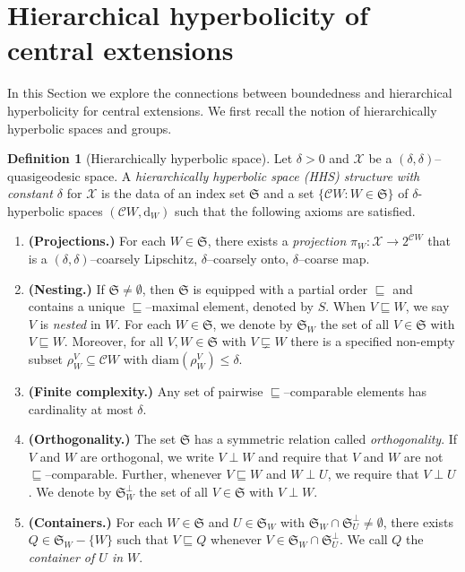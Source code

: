 \documentclass[svgnames]{amsart}
\theoremstyle{plain}
\theoremstyle{definition}
\newtheorem{defn}[thm]{Definition}
\newcommand{\cal}[1]{\mathcal{#1}}
\newcommand{\frakS}{\mathfrak{S}}
\newcommand{\C}{\cal C}
\newcommand{\diam}{\mathrm{diam}}
\newcommand{\dist}{\mathrm{d}}
\newcommand{\nest}{\sqsubseteq}
\newcommand{\propnest}{\sqsubsetneq}
\begin{document}
\section{Hierarchical hyperbolicity of central extensions}\label{sec:HHG}
In this Section we explore the connections between boundedness and hierarchical hyperbolicity for central extensions. We first recall the notion of hierarchically hyperbolic spaces and groups.
\begin{defn}[Hierarchically hyperbolic space]\label{defn:HHS}
Let $\delta>0$ and $\cal{X}$ be a $(\delta,\delta)$--quasigeodesic space.  A \emph{hierarchically hyperbolic space (HHS) structure with constant $\delta$} for $\cal{X}$ is the data of an index set $\frakS$ and a set $\{ \C W \colon W\in\frakS\}$ of $\delta$-hyperbolic spaces $(\C W,\dist_W)$ such that the following axioms are satisfied.  \begin{enumerate}[label=(\arabic*{})]
    \item\textbf{(Projections.)}\label{axiom:projections} For each $W \in \frakS$, there exists a \emph{projection} $\pi_W \colon \cal{X} \rightarrow 2^{\C W}$  that is a $(\delta,\delta)$--coarsely Lipschitz, $\delta$--coarsely onto, $\delta$--coarse map.
		
    \item \textbf{(Nesting.)} \label{axiom:nesting} If $\frakS \neq \emptyset$, then $\frakS$ is equipped with a  partial order $\nest$ and contains a unique $\nest$--maximal element, denoted by $S$. When $V\nest W$, we say $V$ is \emph{nested} in $W$.  For each $W\in\frakS$, we denote by $\frakS_W$ the set of all $V\in\frakS$ with $V\nest W$.  Moreover, for all $V,W\in\frakS$ with $V\propnest W$ there is a specified non-empty subset $\rho^V_W\subseteq \C W$ with $\diam(\rho^V_W)\leq \delta$.
        
    \item \textbf{(Finite complexity.)} \label{axiom:finite_complexity} Any set of pairwise $\nest$--comparable elements has cardinality at most $\delta$.
            
    \item \textbf{(Orthogonality.)} \label{axiom:orthogonal} The set $\frakS$ has a symmetric relation called \emph{orthogonality}. If $V$ and $W$ are orthogonal, we write $V\perp W$ and require that $V$ and $W$ are not $\nest$--comparable. Further, whenever $V\nest W$ and $W\perp U$, we require that $V\perp U$. We denote by $\frakS_W^\perp$ the set of all $V\in \frakS$ with $V\perp W$.

    \item \textbf{(Containers.)} \label{axiom:containers}  For each $W \in \frakS$ and $U \in \frakS_W$ with $ \frakS_W\cap \frakS_U^\perp \neq \emptyset$, there exists $Q \in\frakS_W-\{W\}$ such that $V \nest Q$ whenever $V \in\frakS_W \cap \frakS_U^\perp$.  We call $Q$ the \emph{container of $U$ in $W$}.
		

\end{enumerate}
\end{defn}
\end{document}
